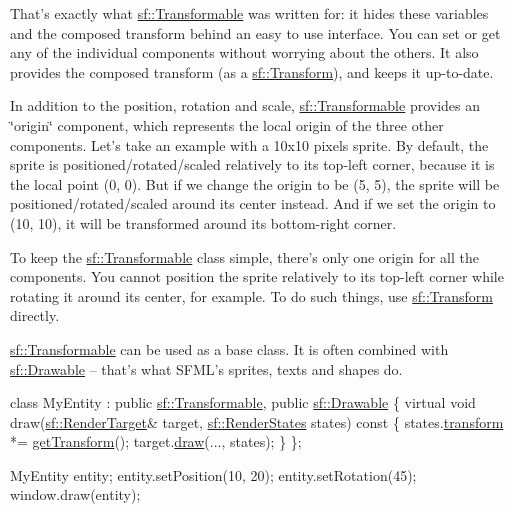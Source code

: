 That's exactly what \hyperlink{classsf_1_1_transformable}{sf\+::\+Transformable} was written for\+: it hides these variables and the composed transform behind an easy to use interface. You can set or get any of the individual components without worrying about the others. It also provides the composed transform (as a \hyperlink{classsf_1_1_transform}{sf\+::\+Transform}), and keeps it up-\/to-\/date.

In addition to the position, rotation and scale, \hyperlink{classsf_1_1_transformable}{sf\+::\+Transformable} provides an \char`\"{}origin\char`\"{} component, which represents the local origin of the three other components. Let's take an example with a 10x10 pixels sprite. By default, the sprite is positioned/rotated/scaled relatively to its top-\/left corner, because it is the local point (0, 0). But if we change the origin to be (5, 5), the sprite will be positioned/rotated/scaled around its center instead. And if we set the origin to (10, 10), it will be transformed around its bottom-\/right corner.

To keep the \hyperlink{classsf_1_1_transformable}{sf\+::\+Transformable} class simple, there's only one origin for all the components. You cannot position the sprite relatively to its top-\/left corner while rotating it around its center, for example. To do such things, use \hyperlink{classsf_1_1_transform}{sf\+::\+Transform} directly.

\hyperlink{classsf_1_1_transformable}{sf\+::\+Transformable} can be used as a base class. It is often combined with \hyperlink{classsf_1_1_drawable}{sf\+::\+Drawable} -- that's what S\+F\+M\+L's sprites, texts and shapes do. 
\begin{DoxyCode}
\textcolor{keyword}{class }MyEntity : \textcolor{keyword}{public} \hyperlink{classsf_1_1_transformable}{sf::Transformable}, \textcolor{keyword}{public} \hyperlink{classsf_1_1_drawable}{sf::Drawable}
\{
    \textcolor{keyword}{virtual} \textcolor{keywordtype}{void} draw(\hyperlink{classsf_1_1_render_target}{sf::RenderTarget}& target, \hyperlink{classsf_1_1_render_states}{sf::RenderStates} states)\textcolor{keyword}{
       const}
\textcolor{keyword}{    }\{
        states.\hyperlink{classsf_1_1_render_states_a1f737981a0f2f0d4bb8dac866a8d1149}{transform} *= \hyperlink{classsf_1_1_transformable_a3b48c3362e3e2c14fef7551252deb7bb}{getTransform}();
        target.\hyperlink{classsf_1_1_render_target_a12417a3bcc245c41d957b29583556f39}{draw}(..., states);
    \}
\};

MyEntity entity;
entity.setPosition(10, 20);
entity.setRotation(45);
window.draw(entity);
\end{DoxyCode}



